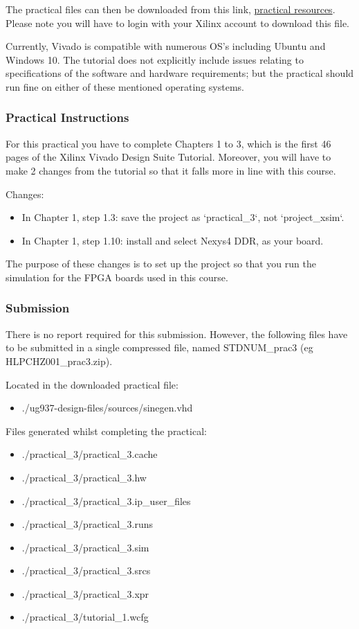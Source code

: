 The practical files can then be downloaded from this link, \href{https://www.xilinx.com/member/forms/download/design-license.html?cid=16f763e2-d450-4d78-ad1a-a68479efa5ac&filename=ug937-design-files.zip}{practical resources}. Please note you will have to login with your Xilinx account to download this file.

Currently, Vivado is compatible with numerous OS’s including Ubuntu and Windows 10. The tutorial does not explicitly include issues relating to specifications of the software and hardware requirements; but the practical should run fine on either of these mentioned operating systems. 

\subsubsection{Practical Instructions}
For this practical you have to complete Chapters 1 to 3, which is the first 46 pages of the Xilinx Vivado Design Suite Tutorial. Moreover, you will have to make 2 changes from the tutorial so that it falls more in line with this course.

Changes:
\begin{itemize}
    \item In Chapter 1, step 1.3: save the project as `practical\_3`, not `project\_xsim`.
    \item In Chapter 1, step 1.10: install and select Nexys4 DDR, as your board.
\end{itemize}

The purpose of these changes is to set up the project so that you run the simulation for the FPGA boards used in this course.

\subsubsection{Submission}
There is no report required for this submission. However, the following files have to be submitted in a single compressed file, named STDNUM\_prac3 (eg HLPCHZ001\_prac3.zip). 

Located in the downloaded practical file: 
\begin{itemize}
    \item ./ug937-design-files/sources/sinegen.vhd
\end{itemize}
 

Files generated whilst completing the practical:
\begin{itemize}
    \item ./practical\_3/practical\_3.cache
    \item ./practical\_3/practical\_3.hw
    \item ./practical\_3/practical\_3.ip\_user\_files
    \item ./practical\_3/practical\_3.runs
    \item ./practical\_3/practical\_3.sim
    \item ./practical\_3/practical\_3.srcs
    \item ./practical\_3/practical\_3.xpr
    \item ./practical\_3/tutorial\_1.wcfg
\end{itemize}

